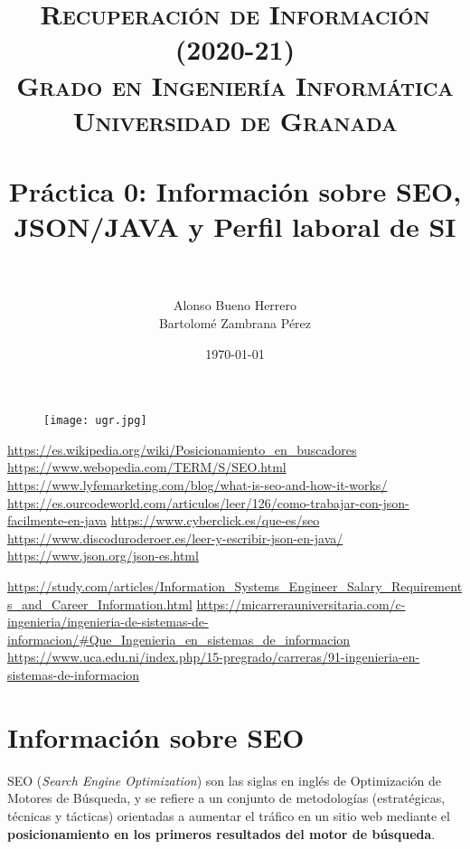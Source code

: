 \documentclass[a4paper,11pt]{scrartcl}
\title{ 
\normalfont \normalsize 
\textsc{\textbf{Recuperación de Información (2020-21)} \\ Grado en Ingeniería Informática \\ Universidad de Granada} \\ [25pt] %
\horrule{0.5pt} \\[0.4cm] %
\huge Práctica 0: Información sobre SEO, JSON/JAVA y Perfil laboral de SI   \\%
\horrule{2pt} \\[0.5cm] %
}
\author{Alonso Bueno Herrero \\ Bartolomé Zambrana Pérez } %
\date{\today} %
\begin{document}
\pagestyle{fancy}


\begin{titlepage}

\maketitle %

\vspace{1cm} 


\begin{figure}[h]
    \centering
    \texttt{[image: ugr.jpg]}
\end{figure}

\end{titlepage}


\newpage
\tableofcontents 


\begin{thebibliography}{99}
   \url{https://es.wikipedia.org/wiki/Posicionamiento_en_buscadores}
\url{https://www.webopedia.com/TERM/S/SEO.html}
\url{https://www.lyfemarketing.com/blog/what-is-seo-and-how-it-works/}
\url{https://es.ourcodeworld.com/articulos/leer/126/como-trabajar-con-json-facilmente-en-java}
 \url{https://www.cyberclick.es/que-es/seo}
\url{https://www.discoduroderoer.es/leer-y-escribir-json-en-java/}
\url{https://www.json.org/json-es.html}

\url{https://study.com/articles/Information_Systems_Engineer_Salary_Requirements_and_Career_Information.html}
\url{https://micarrerauniversitaria.com/c-ingenieria/ingenieria-de-sistemas-de-informacion/#Que_Ingenieria_en_sistemas_de_informacion}
\url{https://www.uca.edu.ni/index.php/15-pregrado/carreras/91-ingenieria-en-sistemas-de-informacion}
\end{thebibliography}



\newpage 




\section{Información sobre SEO}

SEO (\textit{Search Engine Optimization}) son las siglas en inglés de Optimización de Motores de Búsqueda, y se refiere a un conjunto de metodologías (estratégicas, técnicas y tácticas) orientadas a aumentar el tráfico en un sitio web mediante el \textbf{posicionamiento en los primeros resultados del motor de búsqueda}.
\end{document}
